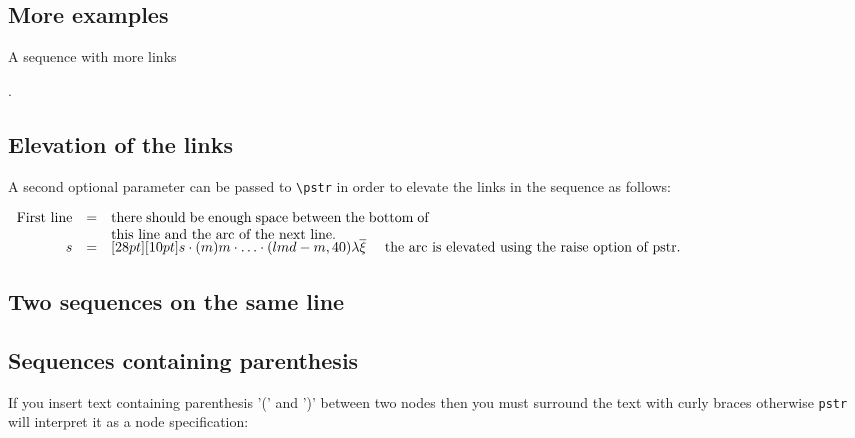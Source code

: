 \subsection{More examples}
A sequence with more links
\begin{codeexample}[width=7cm]
.
\end{codeexample}


\subsection{Elevation of the links}
A second optional parameter can be passed to \verb|\pstr| in order to elevate the links in the sequence as follows:
\begin{codeexample}[width=5cm]
$\begin{array}{rclrcl}
\mbox{First line} &=& \parbox[t]{8cm}{there should be enough space between the
                        bottom of this line and the arc of the next line.} \\
                s &=& \Pstr[28pt][10pt]{ s \cdot (m){m} \cdot \ldots \cdot (lmd-m,40)
                         {\lambda\overline{\xi}} }
    \quad \mbox{ the arc is elevated using the raise option of pstr.}
\end{array}$
\end{codeexample}

\subsection{Two sequences on the same line}
\begin{codeexample}[width=7cm]
\qquad
{}
\end{codeexample}

\subsection{Sequences containing parenthesis}
If you insert text containing parenthesis '(' and ')' between two nodes then you must surround
the text with curly braces otherwise \verb|pstr| will interpret it as a node specification:
\begin{codeexample}[width=7.1cm]
\end{codeexample}


